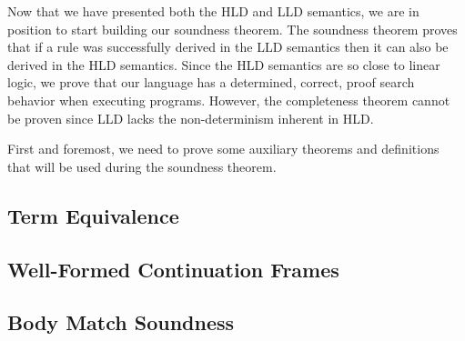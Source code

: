 
Now that we have presented both the HLD and LLD semantics, we are in position to start building our soundness theorem.
The soundness theorem proves that if a rule was successfully derived in the LLD semantics then it can also be derived
in the HLD semantics. Since the HLD semantics are so close to linear logic, we prove that our language has a determined, correct,
proof search behavior when executing programs. However, the completeness theorem cannot be proven since LLD lacks the non-determinism
inherent in HLD.


First and foremost, we need to prove some auxiliary theorems and definitions that will be used during the soundness theorem.

\subsection{Term Equivalence}


\subsection{Well-Formed Continuation Frames}


\subsection{Body Match Soundness}
